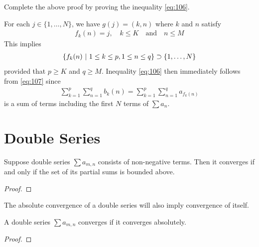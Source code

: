 \documentclass[thmcnt=section, 12pt]{my-elegantbook}
\begin{document}
\begin{exercise}
    Complete the above proof by proving the inequality \eqref{eq:106}.
    \label{ex:5}
\end{exercise}

\begin{solution}
    For each $j \in \{1, \ldots, N\}$, we have $g(j) = (k, n)$ where $k$ and $n$ satisfy
    \begin{align*}
        f_k(n) = j,
        \quad k \leq K
        \quad \text{and} \quad 
        n \leq M
    \end{align*}
    This implies
    \begin{align*}
        \left\{ f_k(n) \ \middle| \ 1 \leq k \leq p, 1 \leq n \leq q \right\}
        \supset \{1, \ldots, N\}
    \end{align*}
    provided that $p \geq K$ and $q \geq M$. Inequality \eqref{eq:106} then immediately follows from \eqref{eq:107} since
    \begin{align*}
        \sum_{k=1}^p \sum_{n=1}^q b_k(n)
        = \sum_{k=1}^p \sum_{n=1}^q a_{f_k(n)}
    \end{align*}
    is a sum of terms including the first $N$ terms of $\sum a_n$.
\end{solution}


\section{Double Series}


\begin{theorem} \label{thm:47}
    Suppose double series $\sum a_{m,n}$ consists of non-negative terms. Then it converges if and only if the set of its partial sums is bounded above.
\end{theorem}

\begin{proof}
\end{proof}


The absolute convergence of a double series will also imply convergence of itself.

\begin{theorem}
    A double series $\sum a_{m,n}$ converges if it converges absolutely.
\end{theorem}

\begin{proof}
\end{proof}
\end{document}
